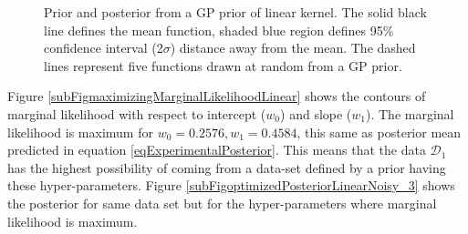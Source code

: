 \begin{figure}[!ht]
  \centering
    \quad
{}\quad

       \caption{Prior and posterior from a GP prior of linear kernel. The solid black line defines the mean function, shaded blue region defines 95\% confidence interval (2$\sigma$) distance away from the mean. The dashed lines represent five functions drawn at random from a GP prior.}
       \label{figPriorAndPosteriorLinearKernel}
\end{figure}

\begin{mdframed}[hidealllines=true,backgroundcolor=lightgray!20]
Figure \ref{subFigmaximizingMarginalLikelihoodLinear} shows the contours of marginal likelihood with respect to intercept ($w_{0}$) and slope ($w_{1}$). The marginal likelihood is maximum for $w_{0} = 0.2576, w_{1} = 0.4584$, this same as posterior mean predicted in equation \ref{eqExperimentalPosterior}. This means that the data $\mathcal{D}_{1}$ has the highest possibility of coming from a data-set defined by a prior having these hyper-parameters. Figure \ref{subFigoptimizedPosteriorLinearNoisy_3} shows the posterior for same data set but for the hyper-parameters where marginal likelihood is maximum.
\end{mdframed}


